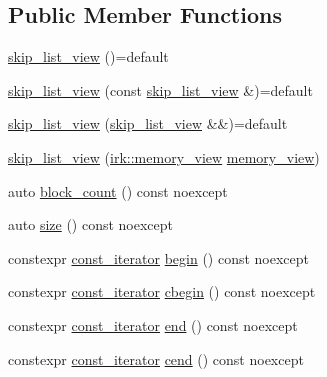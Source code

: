 \subsection*{Public Member Functions}
\begin{DoxyCompactItemize}
\item 
\mbox{\hyperlink{classirk_1_1index_1_1skip__list__view_a97abe4d23715e60ef30892bdd8ad9cd7}{skip\+\_\+list\+\_\+view}} ()=default
\item 
\mbox{\hyperlink{classirk_1_1index_1_1skip__list__view_ab77d6c40db66d837d83675767b25f6f8}{skip\+\_\+list\+\_\+view}} (const \mbox{\hyperlink{classirk_1_1index_1_1skip__list__view}{skip\+\_\+list\+\_\+view}} \&)=default
\item 
\mbox{\hyperlink{classirk_1_1index_1_1skip__list__view_a2e1d39b4efd56dd98ead2a39713d5508}{skip\+\_\+list\+\_\+view}} (\mbox{\hyperlink{classirk_1_1index_1_1skip__list__view}{skip\+\_\+list\+\_\+view}} \&\&)=default
\item 
\mbox{\hyperlink{classirk_1_1index_1_1skip__list__view_a9cadb9826ca85f857e83781ca811f6d3}{skip\+\_\+list\+\_\+view}} (\mbox{\hyperlink{classirk_1_1memory__view}{irk\+::memory\+\_\+view}} \mbox{\hyperlink{classirk_1_1memory__view}{memory\+\_\+view}})
\item 
auto \mbox{\hyperlink{classirk_1_1index_1_1skip__list__view_a923176e9b8851cea6f32f530ad88d25c}{block\+\_\+count}} () const noexcept
\item 
auto \mbox{\hyperlink{classirk_1_1index_1_1skip__list__view_ab77e0b9d495904034e1948609089cf28}{size}} () const noexcept
\item 
constexpr \mbox{\hyperlink{structirk_1_1index_1_1skip__list__view_1_1const__iterator}{const\+\_\+iterator}} \mbox{\hyperlink{classirk_1_1index_1_1skip__list__view_a22e0239c33e18137997aad3da5337591}{begin}} () const noexcept
\item 
constexpr \mbox{\hyperlink{structirk_1_1index_1_1skip__list__view_1_1const__iterator}{const\+\_\+iterator}} \mbox{\hyperlink{classirk_1_1index_1_1skip__list__view_ae6a3b8d467288b8dd044d0ff3fab48a5}{cbegin}} () const noexcept
\item 
constexpr \mbox{\hyperlink{structirk_1_1index_1_1skip__list__view_1_1const__iterator}{const\+\_\+iterator}} \mbox{\hyperlink{classirk_1_1index_1_1skip__list__view_aa22abee7366f281e77e8ab0f556832a5}{end}} () const noexcept
\item 
constexpr \mbox{\hyperlink{structirk_1_1index_1_1skip__list__view_1_1const__iterator}{const\+\_\+iterator}} \mbox{\hyperlink{classirk_1_1index_1_1skip__list__view_afce38149f8be877dd4426e16da060dc6}{cend}} () const noexcept
\end{DoxyCompactItemize}


